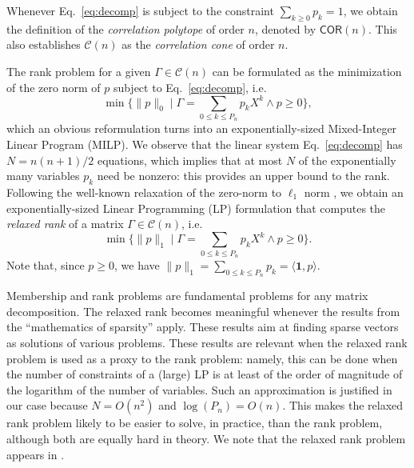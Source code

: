 \documentclass[envcountsect,envcountsame]{svjour3}
\theoremstyle{changebreak}                %
\newcommand{\COR}[1]{\mathsf{COR}(#1)}
\newcommand{\CONX}[1]{\mathcal{C}(#1)}
\begin{document}
Whenever Eq.~\eqref{eq:decomp} is subject to the constraint $\sum_{k\ge 0} p_k=1$, we obtain the definition of the \textit{correlation polytope} of order $n$, denoted by $\COR{n}$. This also establishes $\CONX{n}$ as the \textit{correlation cone} of order $n$. 

The rank problem for a given $\Gamma\in\CONX{n}$ can be formulated as the minimization of the zero norm of $p$ subject to Eq.~\ref{eq:decomp}, i.e.
\begin{equation}
  \min\{\|p\|_0 \;|\; \Gamma = \sum\limits_{0\le k\le P_n} p_k X^k \land p\ge 0\},
  \label{eq:rank}
\end{equation}
which an obvious reformulation turns into an exponentially-sized Mixed-Integer Linear Program (MILP). We observe that the linear system Eq.~\eqref{eq:decomp} has $N=n(n+1)/2$ equations, which implies that at most $N$ of the exponentially many variables $p_k$ need be nonzero: this provides an upper bound to the rank. Following the well-known relaxation of the zero-norm to $\ell_1$ norm \cite{candestao2005}, we obtain an exponentially-sized Linear Programming (LP) formulation that computes the \textit{relaxed rank} of a matrix $\Gamma\in\CONX{n}$, i.e.
\begin{equation}
  \min\{\|p\|_1\;|\; \Gamma = \sum\limits_{0\le k\le P_n} p_k X^k \land p\ge 0\}.
  \label{eq:relrank}
\end{equation}
Note that, since $p\ge 0$, we have $\|p\|_1=\sum\limits_{0\le k\le P_n} p_k=\langle\mathbf{1},p\rangle$.

Membership and rank problems are fundamental problems for any matrix decomposition. The relaxed rank becomes meaningful whenever the results from the ``mathematics of sparsity'' \cite{candes,moitra} apply. These results aim at finding sparse vectors as solutions of various problems. These results are relevant when the relaxed rank problem is used as a proxy to the rank problem: namely, this can be done when the number of constraints of a (large) LP is at least of the order of magnitude of the logarithm of the number of variables.  Such an approximation is justified in our case because $N=O(n^2)$ and $\log(P_n)=O(n)$. This makes the relaxed rank problem likely to be easier to solve, in practice, than the rank problem, although both are equally hard in theory. We note that the relaxed rank problem appears in \cite{furini}.
\end{document}
